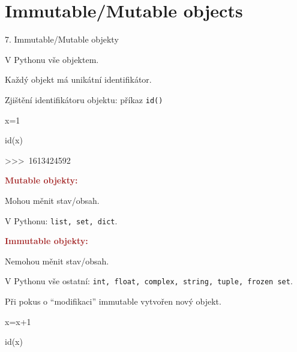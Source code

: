 \documentclass[czech]{beamer}
\newenvironment{lyxcode}
  {\par\begin{list}{}{
    \setlength{\rightmargin}{\leftmargin}
    \setlength{\listparindent}{0pt}%
    \raggedright
    \setlength{\itemsep}{0pt}
    \setlength{\parsep}{0pt}
    \normalfont\ttfamily}%
   \def\{{\char`\{}
   \def\}{\char`\}}
   \def\textasciitilde{\char`\~}
   \item[]}
  {\end{list}}
\begin{document}
\section{Immutable/Mutable objects}
\begin{frame}[plain]{7. Immutable/Mutable objekty}

{\scriptsize V Pythonu vše objektem. }{\scriptsize\par}

{\scriptsize Každý objekt má unikátní identifikátor.}{\scriptsize\par}

{\scriptsize Zjištění identifikátoru objektu: příkaz }{\scriptsize\texttt{id()}}{\scriptsize\par}
\begin{lyxcode}
{\scriptsize x=1}{\scriptsize\par}

{\scriptsize id(x)~}{\scriptsize\par}

{\scriptsize >\textcompwordmark >\textcompwordmark >~1613424592~}{\scriptsize\par}
\end{lyxcode}
{\scriptsize\textbf{\textcolor{brown}{Mutable objekty:}}}{\scriptsize\par}

{\scriptsize Mohou měnit stav/obsah.}{\scriptsize\par}

{\scriptsize V Pythonu: }{\scriptsize\texttt{list, set, dict}}{\scriptsize .\medskip{}
}{\scriptsize\par}

{\scriptsize\textbf{\textcolor{brown}{Immutable objekty:}}}{\scriptsize\par}

{\scriptsize Nemohou měnit stav/obsah.}{\scriptsize\par}

{\scriptsize V Pythonu vše ostatní: }{\scriptsize\texttt{int, float,
complex, string, tuple, frozen set}}{\scriptsize .}{\scriptsize\par}

{\scriptsize Při pokus o ``modifikaci'' immutable vytvořen nový objekt.}{\scriptsize\par}
\begin{lyxcode}
{\scriptsize x=x+1}{\scriptsize\par}

{\scriptsize id(x)~}{\scriptsize\par}


\end{lyxcode}
\end{frame}
\end{document}
